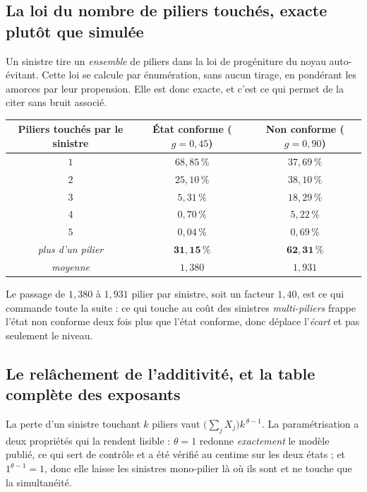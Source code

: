 \subsection*{La loi du nombre de piliers touchés, exacte plutôt que simulée}

Un sinistre tire un \emph{ensemble} de piliers dans la loi de progéniture du noyau auto-évitant.
Cette loi se calcule par énumération, sans aucun tirage, en pondérant les amorces par leur
propension. Elle est donc exacte, et c'est ce qui permet de la citer sans bruit associé.

\begin{center}\footnotesize
\renewcommand{\arraystretch}{1.25}
\begin{tabular}{@{}c c c@{}}
\toprule
\textbf{Piliers touchés par le sinistre} & \textbf{État conforme} ($g=0{,}45$) &
\textbf{Non conforme} ($g=0{,}90$) \\
\midrule
$1$ & $68{,}85\,\%$ & $37{,}69\,\%$ \\
$2$ & $25{,}10\,\%$ & $38{,}10\,\%$ \\
$3$ & $5{,}31\,\%$ & $18{,}29\,\%$ \\
$4$ & $0{,}70\,\%$ & $5{,}22\,\%$ \\
$5$ & $0{,}04\,\%$ & $0{,}69\,\%$ \\
\midrule
\emph{plus d'un pilier} & $\mathbf{31{,}15\,\%}$ & $\mathbf{62{,}31\,\%}$ \\
\emph{moyenne} & $1{,}380$ & $1{,}931$ \\
\bottomrule
\end{tabular}
\end{center}

\vspace{4pt}
\noindent Le passage de $1{,}380$ à $1{,}931$ pilier par sinistre, soit un facteur $1{,}40$, est ce
qui commande toute la suite : ce qui touche au coût des sinistres \emph{multi-piliers} frappe l'état
non conforme deux fois plus que l'état conforme, donc déplace l'\emph{écart} et pas seulement le
niveau.

\subsection*{Le relâchement de l'additivité, et la table complète des exposants}

La perte d'un sinistre touchant $k$ piliers vaut $\bigl(\sum_j X_j\bigr)k^{\,\theta-1}$. La
paramétrisation a deux propriétés qui la rendent lisible : $\theta=1$ redonne \emph{exactement} le
modèle publié, ce qui sert de contrôle et a été vérifié au centime sur les deux états ; et
$1^{\theta-1}=1$, donc elle laisse les sinistres mono-pilier là où ils sont et ne touche que la
simultanéité.

